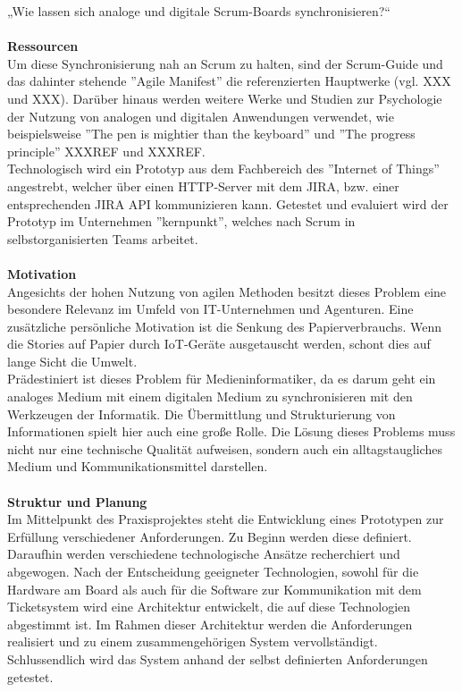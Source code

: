 \documentclass[12pt,titlepage]{scrartcl}
\begin{document}
„Wie lassen sich analoge und digitale Scrum-Boards synchronisieren?“ \\ \\
\textbf{Ressourcen} \\
Um diese Synchronisierung nah an Scrum zu halten, sind der Scrum-Guide und das dahinter stehende ''Agile  Manifest'' die referenzierten Hauptwerke (vgl. XXX und XXX). Darüber hinaus werden weitere Werke und Studien zur Psychologie der Nutzung von analogen und digitalen Anwendungen verwendet, wie beispielsweise ''The pen is mightier than the keyboard'' und ''The progress principle'' XXXREF und XXXREF. \\
Technologisch wird ein Prototyp aus dem Fachbereich des ''Internet of Things'' angestrebt, welcher über einen HTTP-Server mit dem JIRA, bzw. einer entsprechenden JIRA API kommunizieren kann. Getestet und evaluiert wird der Prototyp im Unternehmen ''kernpunkt'', welches nach Scrum in selbstorganisierten Teams arbeitet.\\ \\
\textbf{Motivation} \\
Angesichts der hohen Nutzung von agilen Methoden besitzt dieses Problem eine besondere Relevanz im Umfeld von IT-Unternehmen und Agenturen. Eine zusätzliche persönliche Motivation ist die Senkung des Papierverbrauchs. Wenn die Stories auf Papier durch IoT-Geräte ausgetauscht werden, schont dies auf lange Sicht die Umwelt. \\
Prädestiniert ist dieses Problem für Medieninformatiker, da es darum geht ein analoges Medium mit einem digitalen Medium zu synchronisieren mit den Werkzeugen der Informatik. Die Übermittlung und Strukturierung von Informationen spielt hier auch eine große Rolle. Die Lösung dieses Problems muss nicht nur eine technische Qualität aufweisen, sondern auch ein alltagstaugliches Medium und Kommunikationsmittel darstellen.\\ \\
\textbf{Struktur und Planung} \\
Im Mittelpunkt des Praxisprojektes steht die Entwicklung eines Prototypen zur Erfüllung verschiedener Anforderungen. Zu Beginn werden diese definiert. Daraufhin werden verschiedene technologische Ansätze recherchiert und abgewogen. Nach der Entscheidung geeigneter Technologien, sowohl für die Hardware am Board als auch für die Software zur Kommunikation mit dem Ticketsystem wird eine Architektur entwickelt, die auf diese Technologien abgestimmt ist. Im Rahmen dieser Architektur werden die Anforderungen realisiert und zu einem zusammengehörigen System vervollständigt. Schlussendlich wird das System anhand der selbst definierten Anforderungen getestet.\\ \\
\end{document}
